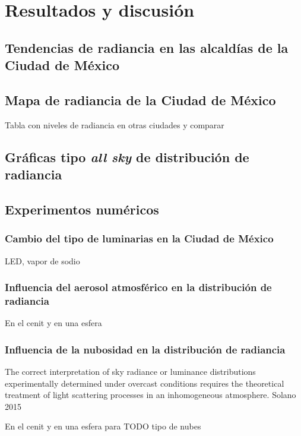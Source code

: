 \chapter{Resultados y discusión}

\section{Tendencias de radiancia en las alcaldías de la Ciudad de México}

\section{Mapa de radiancia de la Ciudad de México}

Tabla con niveles de radiancia en otras ciudades y comparar

\section{Gráficas tipo \textit{all sky} de distribución de radiancia}

\section{Experimentos numéricos}

\subsection{Cambio del tipo de luminarias en la Ciudad de México}

LED, vapor de sodio

\subsection{Influencia del aerosol atmosférico en la distribución de radiancia}

En el cenit y en una esfera

\subsection{Influencia de la nubosidad en la distribución de radiancia}

The correct interpretation of sky radiance
or luminance distributions experimentally
determined under overcast conditions
requires the theoretical treatment of light
scattering processes in an inhomogeneous
atmosphere. Solano 2015

En el cenit y en una esfera para TODO tipo de nubes